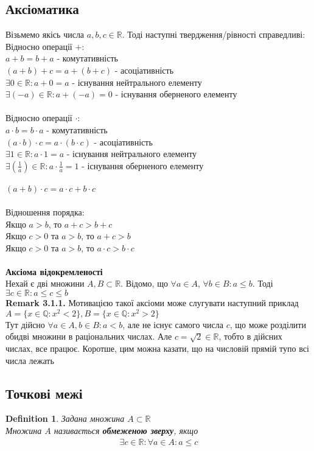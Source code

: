 \documentclass[a4paper, 14pt]{extarticle}
\def\huge{\displaystyle}
\def\bigline{\vspace{5mm}\\}
\theoremstyle{theoremdd}
\theoremstyle{theoremdd}
\newtheorem{definition}[theorem]{Definition}
\theoremstyle{theoremdd}
\theoremstyle{theoremdd}
\theoremstyle{theoremdd}
\theoremstyle{theoremdd}
\theoremstyle{theoremdd}
\theoremstyle{theoremdd}
\begin{document}
	\subsection{Аксіоматика}
	Візьмемо якісь числа $a,b,c \in\mathbb{R}$. Тоді наступні твердження/рівності справедливі:\\
	Відносно операції $+$:\\
	$a+b=b+a$ - комутативність\\
	$(a+b)+c=a+(b+c)$ - асоціативність\\
	$\exists 0 \in\mathbb{R}: a+0=a$ - існування нейтрального елементу\\
	$\exists (-a) \in\mathbb{R}: a+(-a)=0$ - існування оберненого елементу\\
	\\
	Відносно операції $\cdot$:\\
	$a \cdot b=b \cdot a$ - комутативність\\
	$(a \cdot b) \cdot c=a \cdot (b \cdot c)$ - асоціативність\\
	$\exists 1 \in\mathbb{R}: a \cdot 1=a$ - існування нейтрального елементу\\
	$\huge \exists \left(\frac{1}{a}\right) \in\mathbb{R}: a \cdot \frac{1}{a}=1$ - існування оберненого елементу\\
	\\
	$(a+b) \cdot c = a \cdot c + b \cdot c$\\
	\\
	Відношення порядка:\\
	Якщо $a>b$, то $a+c>b+c$\\
	Якщо $c>0$ та $a>b$, то $a+c>b$\\
	Якщо $c>0$ та $a>b$, то $a \cdot c>b \cdot c$\\
	\\
	\textbf{Аксіома відокремленості}\\
	Нехай є дві множини $A,B \subset \mathbb{R}$. Відомо, що $\forall a \in A$, $\forall b \in B: a \leq b$. Тоді $\exists c \in \mathbb{R}: a \leq c \leq b$
	\bigline
	\textbf{Remark 3.1.1.} Мотивацією такої аксіоми може слугувати наступний приклад\\
	$A= \{x \in \mathbb{Q}: x^2 < 2\}, B = \{x \in \mathbb{Q}: x^2 > 2\}$\\
	Тут дійсно $\forall a \in A, b \in B: a < b$, але не існує самого числа $c$, що може розділити обидві множини в раціональних числах. Але $c =\sqrt{2} \in \mathbb{R}$, тобто в дійсних числах, все працює. Коротше, цим можна казати, що на числовій прямій тупо всі числа лежать
	\bigline
	\subsection{Точкові межі}
	\begin{definition}
	Задана множина $A \subset \mathbb{R}$\\
	Множина $A$ називається \textbf{обмеженою зверху}, якщо
	\begin{align*}
	\exists c \in \mathbb{R}: \forall a \in A: a \leq c
	\end{align*}
	\end{definition}
\end{document}
